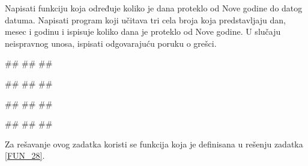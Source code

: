 \begin{Exercise}[label=FUN_26] 
Napisati funkciju  koja određuje koliko je dana proteklo od Nove godine do
datog datuma. Napisati program koji učitava tri cela broja koja predstavljaju dan, mesec i godinu i ispisuje
koliko dana je proteklo od Nove godine. 
U slučaju neispravnog unosa, ispisati odgovarajuću poruku o grešci. 

\begin{miditest}
\begin{upotreba}{1}
#\naslovInt#
##
##
\end{upotreba}
\end{miditest}
\begin{miditest}
\begin{upotreba}{2}
#\naslovInt#
##
##
\end{upotreba}
\end{miditest}

\begin{miditest}
\begin{upotreba}{3}
#\naslovInt#
##
##
\end{upotreba}
\end{miditest}
\begin{miditest}
\begin{upotreba}{4}
#\naslovInt#
##
##
\end{upotreba}
\end{miditest}

\end{Exercise}
\ifresenja 
\begin{Answer}[ref=FUN_26]

Za rešavanje ovog zadatka koristi se funkcija  koja je definisana u rešenju zadatka \ref{FUN_28}.
\end{Answer} 
\fi


